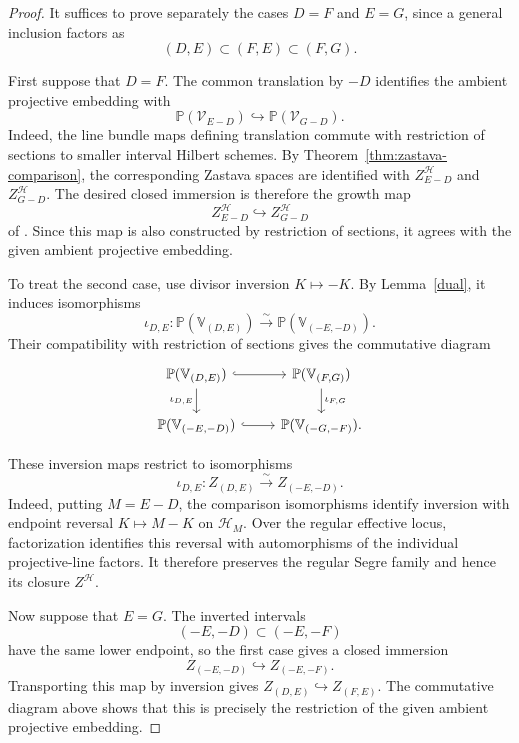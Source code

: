 \documentclass{amsart}
\numberwithin{equation}{section}
\numberwithin{figure}{section}
\theoremstyle{definition}
\theoremstyle{remark}
\renewcommand{\c}[1]{\mathcal{#1}}
\renewcommand{\b}[1]{\mathbb{#1}}
\begin{document}
\begin{proof}
	It suffices to prove separately the cases $D=F$ and
	$E=G$, since a general inclusion factors as
	\[
	(D,E)\subset(F,E)\subset(F,G).
	\]
	
	First suppose that $D=F$.
	The common translation by $-D$ identifies the
	ambient projective embedding with
	\[
	\b P(\c V_{E-D})\hookrightarrow\b P(\c V_{G-D}).
	\]
	Indeed, the line bundle maps defining translation
	commute with restriction of sections to smaller
	interval Hilbert schemes.
	By Theorem~\ref{thm:zastava-comparison}, the
	corresponding Zastava spaces are identified with
	$Z^{\c H}_{E-D}$ and $Z^{\c H}_{G-D}$.
	The desired closed immersion is therefore the
	growth map
	\[
	Z^{\c H}_{E-D}\hookrightarrow Z^{\c H}_{G-D}
	\]
	of \cite[\S2.3.1, Lemma~(a)]{mirkovic2023lattice}.
	Since this map is also constructed by restriction
	of sections, it agrees with the given ambient
	projective embedding.
	
	To treat the second case, use divisor inversion
	$K\mapsto-K$.
	By Lemma~\ref{dual}, it induces isomorphisms
	\[
	\iota_{D,E}:
	\b P(\b V_{(D,E)})
	\xrightarrow{\sim}
	\b P(\b V_{(-E,-D)}).
	\]
	Their compatibility with restriction of sections
	gives the commutative diagram
	\[
	\begin{tikzcd}
		\b P(\b V_{(D,E)})
		\arrow[r,hook]
		\arrow[d,"\iota_{D,E}"']
		&
		\b P(\b V_{(F,G)})
		\arrow[d,"\iota_{F,G}"]
		\\
		\b P(\b V_{(-E,-D)})
		\arrow[r,hook]
		&
		\b P(\b V_{(-G,-F)}).
	\end{tikzcd}
	\]
	
	These inversion maps restrict to isomorphisms
	\[
	\iota_{D,E}:Z_{(D,E)}
	\xrightarrow{\sim}Z_{(-E,-D)}.
	\]
	Indeed, putting $M=E-D$, the comparison
	isomorphisms identify inversion with endpoint
	reversal $K\mapsto M-K$ on $\c H_M$.
	Over the regular effective locus, factorization
	identifies this reversal with automorphisms of
	the individual projective-line factors.
	It therefore preserves the regular Segre family
	and hence its closure $Z^{\c H}$.
	
	Now suppose that $E=G$.
	The inverted intervals
	\[
	(-E,-D)\subset(-E,-F)
	\]
	have the same lower endpoint, so the first case
	gives a closed immersion
	\[
	Z_{(-E,-D)}\hookrightarrow Z_{(-E,-F)}.
	\]
	Transporting this map by inversion gives
	$Z_{(D,E)}\hookrightarrow Z_{(F,E)}$.
	The commutative diagram above shows that this
	is precisely the restriction of the given
	ambient projective embedding.
\end{proof}
\end{document}
